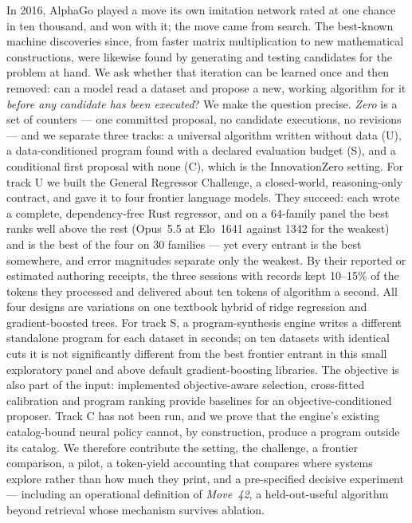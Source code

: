 \begin{izabstract}
\par\smallskip
\noindent In 2016, AlphaGo played a move its own imitation network rated at one chance in ten
thousand, and won with it; the move came from search. The best-known machine discoveries since, from faster
matrix multiplication to new mathematical constructions, were likewise found by generating and
testing candidates for the problem at hand. We ask whether that iteration can be learned once and
then removed: can a model read a dataset and propose a new, working algorithm for it \emph{before
any candidate has been executed}? We make the question precise. \emph{Zero} is a set of counters
--- one committed proposal, no candidate executions, no revisions --- and we separate three tracks:
a universal algorithm written without data (U), a data-conditioned program found with a declared
evaluation budget (S), and a conditional first proposal with none (C), which is the InnovationZero
setting. For track U we built the General Regressor Challenge, a closed-world, reasoning-only
contract, and gave it to four frontier language models. They succeed: each wrote a complete,
dependency-free Rust regressor, and on a 64-family panel the best ranks well above the rest
(Opus~5.5 at Elo~1641 against 1342 for the weakest) and is the best of the four on 30 families ---
yet every entrant is the best somewhere, and error magnitudes separate only the weakest. By their reported or estimated authoring
receipts, the three sessions with records kept 10--15\% of the tokens they processed and delivered
about ten tokens of algorithm a second. All four designs are variations on one textbook hybrid of
ridge regression and gradient-boosted trees. For
track S, a program-synthesis engine writes a different standalone program for each dataset in
seconds; on ten datasets with identical cuts it is not significantly different from the best
frontier entrant in this small exploratory panel and above default gradient-boosting libraries. The objective is also part of the input: implemented objective-aware selection, cross-fitted calibration and program ranking provide baselines for an objective-conditioned proposer. Track C has not been run, and we
prove that the engine's existing catalog-bound neural policy cannot, by construction, produce a
program outside its catalog. We therefore contribute the setting, the challenge, a frontier comparison, a pilot, a
token-yield accounting that compares where systems explore rather than how much they print, and a
pre-specified decisive experiment --- including an operational definition of \emph{Move~42}, a
held-out-useful algorithm beyond retrieval whose mechanism survives ablation.
\end{izabstract}

